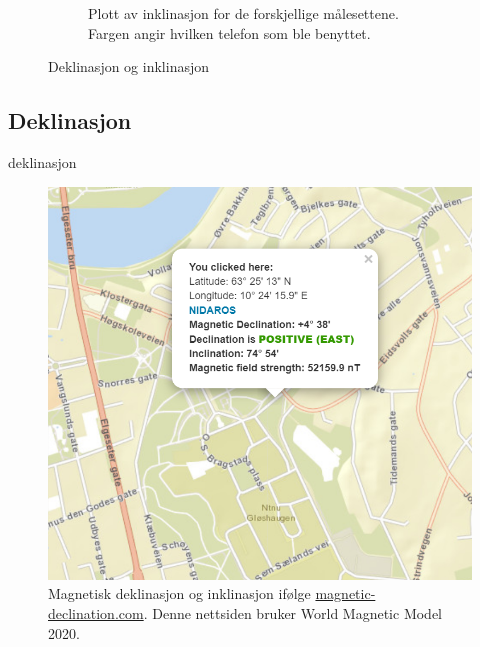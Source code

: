 \begin{figure}
\begin{subfigure}{.5\textwidth}
    \caption{Plott av inklinasjon for de forskjellige målesettene. \\
    Fargen angir hvilken telefon som ble benyttet.}
    \label{fig:plot_inklination}
\end{subfigure}
    \caption{Deklinasjon og inklinasjon}
    \label{Ink_og_dek}
\end{figure}


\subsection{Deklinasjon}

{deklinasjon}

\begin{figure}
    \centering
    \includegraphics{img/WMM.png}
    \caption{Magnetisk deklinasjon og inklinasjon ifølge \href{https://www.magnetic-declination.com/}{magnetic-declination.com}. Denne nettsiden bruker World Magnetic Model 2020.}
    \label{fig:WMM}
\end{figure}
